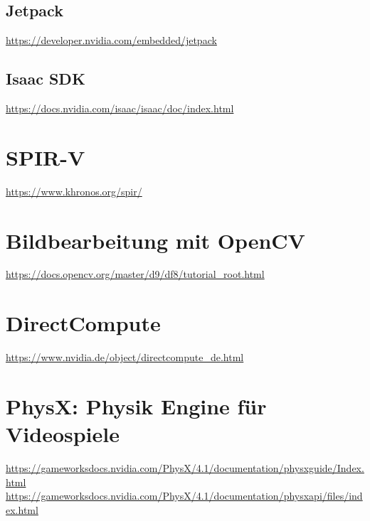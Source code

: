 \documentclass[a4paper,headsepline=3pt,headinclude=true,12pt,oneside]{scrbook}
\begin{document}
\begin{onehalfspacing}
		\section{Jetpack}
		\url{https://developer.nvidia.com/embedded/jetpack}
		\section{Isaac SDK}
		\url{https://docs.nvidia.com/isaac/isaac/doc/index.html}
		
	\chapter{SPIR-V}
	\url{https://www.khronos.org/spir/}
	
	\chapter{Bildbearbeitung mit OpenCV}
	\url{https://docs.opencv.org/master/d9/df8/tutorial_root.html}
	
	\chapter{DirectCompute}
	\url{https://www.nvidia.de/object/directcompute_de.html}
	
	\chapter{PhysX: Physik Engine f\"ur Videospiele}
	\url{https://gameworksdocs.nvidia.com/PhysX/4.1/documentation/physxguide/Index.html} \\
	\url{https://gameworksdocs.nvidia.com/PhysX/4.1/documentation/physxapi/files/index.html}

	
	
	\printbibliography

\end{onehalfspacing}	
\end{document}
